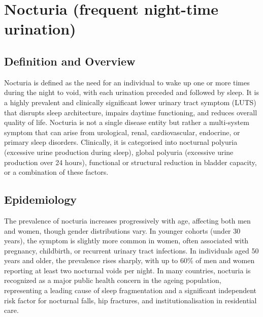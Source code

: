 \chapter{Nocturia (frequent night-time urination)}

\section*{Definition and Overview}
Nocturia is defined as the need for an individual to wake up one or more times during the night to void, with each urination preceded and followed by sleep. It is a highly prevalent and clinically significant lower urinary tract symptom (LUTS) that disrupts sleep architecture, impairs daytime functioning, and reduces overall quality of life. Nocturia is not a single disease entity but rather a multi-system symptom that can arise from urological, renal, cardiovascular, endocrine, or primary sleep disorders. Clinically, it is categorised into nocturnal polyuria (excessive urine production during sleep), global polyuria (excessive urine production over 24 hours), functional or structural reduction in bladder capacity, or a combination of these factors.

\section*{Epidemiology}
The prevalence of nocturia increases progressively with age, affecting both men and women, though gender distributions vary. In younger cohorts (under 30 years), the symptom is slightly more common in women, often associated with pregnancy, childbirth, or recurrent urinary tract infections. In individuals aged 50 years and older, the prevalence rises sharply, with up to 60\% of men and women reporting at least two nocturnal voids per night. In many countries, nocturia is recognized as a major public health concern in the ageing population, representing a leading cause of sleep fragmentation and a significant independent risk factor for nocturnal falls, hip fractures, and institutionalisation in residential care.

